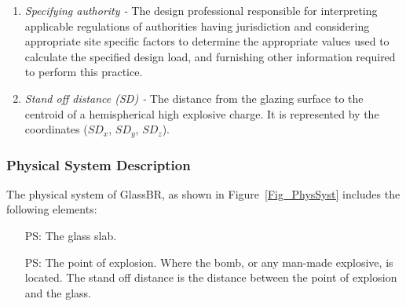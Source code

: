 \documentclass[12pt]{article}
\newcounter{physsysnum} %
\newcommand{\progname}{GlassBR}
\begin{document}
\begin{enumerate}
\item \textit{Specifying authority -} The design professional responsible for 
interpreting applicable regulations of authorities having jurisdiction and 
considering appropriate site specific factors to determine the appropriate 
values used to calculate the specified design load, and furnishing other 
information required to perform this practice.

\item \textit{Stand off distance (SD) -} The distance from the glazing surface to the 
centroid of a hemispherical high explosive charge. It is represented by the coordinates (${SD_{x}}$, ${SD_{y}}$, ${SD_{z}}$).
\end{enumerate}

\subsubsection{Physical System Description}

The physical system of \progname, as shown in Figure~\ref{Fig_PhysSyst} includes
the following elements:
\begin{itemize}
\item[PS\refstepcounter{physsysnum}\thephyssysnum:] The glass slab.
\item[PS\refstepcounter{physsysnum}\thephyssysnum:] The point of explosion. Where the bomb, or any man-made explosive,
  is located. The stand off distance is the distance between the point of
  explosion and the glass.
\end{itemize}
 
\end{document}
